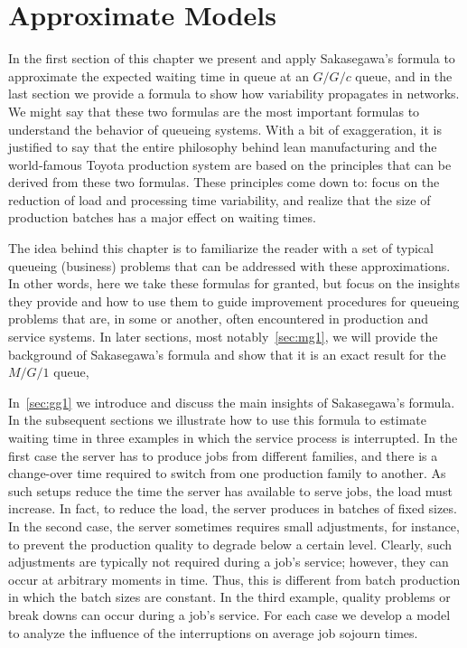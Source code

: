 \chapter{Approximate Models}
\label{cha:approximate-models}
In the first section of this chapter we present and apply Sakasegawa's formula to approximate the expected waiting time in queue at an $G/G/c$ queue, and in the last section we provide a formula to show how variability propagates in networks.
We might say that these two formulas are the most important formulas to understand the behavior of queueing systems.
With a bit of exaggeration, it is justified to say that the entire philosophy behind lean manufacturing and the world-famous Toyota production system are based on the principles that can be derived from these two formulas. These principles come down to: focus on the reduction of load and processing time variability, and realize that the size of production batches has a major effect on waiting times.

The idea behind this chapter is to familiarize the reader with a set of typical queueing (business) problems that can be addressed with these approximations.
In other words, here we take these formulas for granted, but focus on the insights they provide and how to use them to guide improvement procedures for queueing problems that are, in some or another, often encountered in production and service systems.
In later sections, most notably~\cref{sec:mg1}, we will provide the background of Sakasegawa's formula and show that it is an exact result for the $M/G/1$ queue,

In~\cref{sec:gg1} we introduce and discuss the main insights of Sakasegawa's formula.
In the subsequent sections we illustrate how to use this formula to estimate waiting time in three examples in which the service process is interrupted.
In the first case the server has to produce jobs from different families, and there is a change-over time required to switch from one production family to another.
As such setups reduce the time the server has available to serve jobs, the load must increase.
In fact, to reduce the load, the server produces in batches of fixed sizes.
In the second case, the server sometimes requires small adjustments, for instance, to prevent the production quality to degrade below a certain level.
Clearly, such adjustments are typically not required during a job's service; however, they can occur at arbitrary moments in time.
Thus, this is different from batch production in which the batch sizes are constant.
In the third example, quality problems or break downs can occur during a job's service.
For each case we develop a model to analyze the influence of the interruptions on average job sojourn times.

